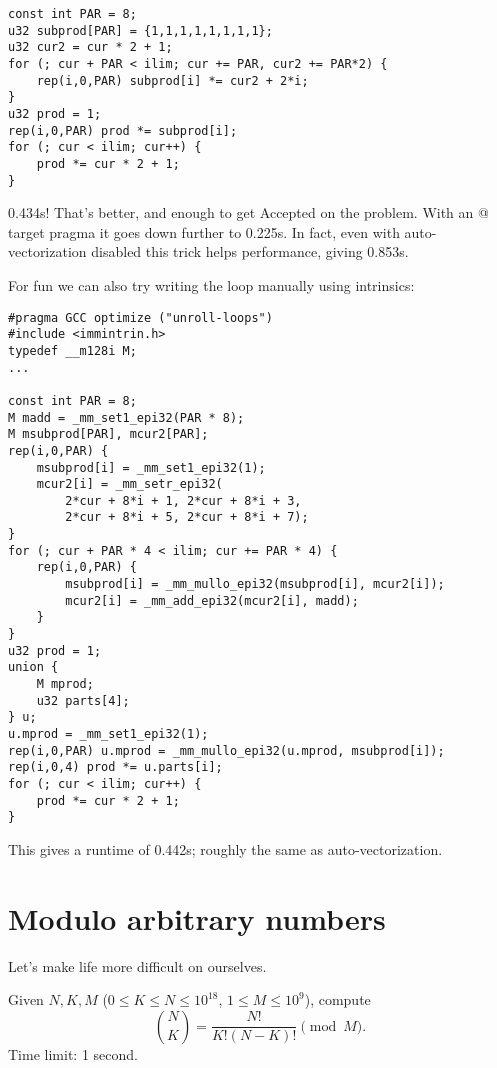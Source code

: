 \begin{lstlisting}
const int PAR = 8;
u32 subprod[PAR] = {1,1,1,1,1,1,1,1};
u32 cur2 = cur * 2 + 1;
for (; cur + PAR < ilim; cur += PAR, cur2 += PAR*2) {
	rep(i,0,PAR) subprod[i] *= cur2 + 2*i;
}
u32 prod = 1;
rep(i,0,PAR) prod *= subprod[i];
for (; cur < ilim; cur++) {
	prod *= cur * 2 + 1;
}
\end{lstlisting}

0.434s! That's better, and enough to get Accepted on the problem.
With an @ target pragma it goes down further to 0.225s.
In fact, even with auto-vectorization disabled this trick helps performance, giving 0.853s.

For fun we can also try writing the loop manually using intrinsics:
\begin{lstlisting}
#pragma GCC optimize ("unroll-loops")
#include <immintrin.h>
typedef __m128i M;
...

const int PAR = 8;
M madd = _mm_set1_epi32(PAR * 8);
M msubprod[PAR], mcur2[PAR];
rep(i,0,PAR) {
	msubprod[i] = _mm_set1_epi32(1);
	mcur2[i] = _mm_setr_epi32(
	    2*cur + 8*i + 1, 2*cur + 8*i + 3,
	    2*cur + 8*i + 5, 2*cur + 8*i + 7);
}
for (; cur + PAR * 4 < ilim; cur += PAR * 4) {
	rep(i,0,PAR) {
		msubprod[i] = _mm_mullo_epi32(msubprod[i], mcur2[i]);
		mcur2[i] = _mm_add_epi32(mcur2[i], madd);
	}
}
u32 prod = 1;
union {
	M mprod;
	u32 parts[4];
} u;
u.mprod = _mm_set1_epi32(1);
rep(i,0,PAR) u.mprod = _mm_mullo_epi32(u.mprod, msubprod[i]);
rep(i,0,4) prod *= u.parts[i];
for (; cur < ilim; cur++) {
	prod *= cur * 2 + 1;
}
\end{lstlisting}

This gives a runtime of 0.442s; roughly the same as auto-vectorization.

\section{Modulo arbitrary numbers}

Let's make life more difficult on ourselves.

\begin{framed}
\noindent
Given $N, K, M$ ($0 \le K \le N \le 10^{18}$, $1 \le M \le 10^9$), compute
\[
\binom N K = \frac{N!}{K!(N-K)!} \pmod {M}.
\]
Time limit: 1 second.
\end{framed}

